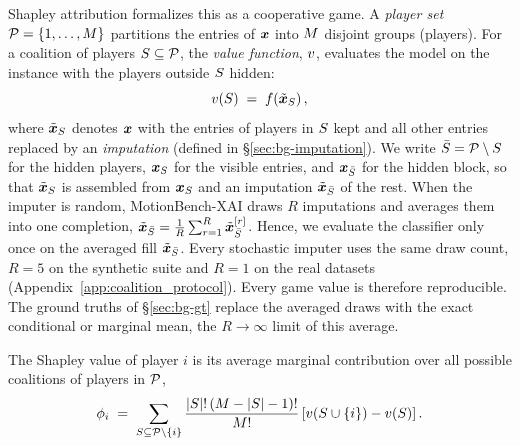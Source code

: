Shapley attribution \citep{lundberg2017unified} formalizes this as a cooperative game. A \emph{player set} $\mathcal{P} = \{1, \dots, M\}$ partitions the entries of $\bm{x}$ into $M$ disjoint groups (players).  For a coalition of players $S \subseteq \mathcal{P}$, the \emph{value function}, $v$, evaluates the model on the instance with the players outside $S$ hidden:
\begin{equation}
  v(S) \;=\; f\!\left(\tilde{\bm{x}}_{S}\right),
  \label{eq:value}
\end{equation}
where $\tilde{\bm{x}}_{S}$ denotes $\bm{x}$ with the entries of players in $S$ kept and all other entries replaced by an \emph{imputation} (defined in \S\ref{sec:bg-imputation}). We write $\bar{S} = \mathcal{P} \setminus S$ for the hidden players, $\bm{x}_{S}$ for the visible entries, and $\bm{x}_{\bar{S}}$ for the hidden block, so that $\tilde{\bm{x}}_{S}$ is assembled from $\bm{x}_{S}$ and an imputation $\tilde{\bm{x}}_{\bar{S}}$ of the rest.
When the imputer is random, MotionBench-XAI draws $R$ imputations and averages them into one completion, $\tilde{\bm{x}}_{\bar{S}} = \frac{1}{R} \sum_{r=1}^{R} \tilde{\bm{x}}^{[r]}_{\bar{S}}$. Hence, we evaluate the classifier only once on the averaged fill $\tilde{\bm{x}}_{\bar{S}}$. Every stochastic imputer uses the same draw count, $R{=}5$ on the synthetic suite and $R{=}1$ on the real datasets (Appendix~\ref{app:coalition_protocol}). Every game value is therefore reproducible. The ground truths of
\S\ref{sec:bg-gt} replace the averaged draws with the exact conditional or
marginal mean, the $R \to \infty$ limit of this average.


The Shapley value \citep{shapley1953value} of player $i$ is its average marginal contribution over all possible coalitions of players in $\mathcal{P}$,
\begin{equation}
  \phi_i \;=\; \sum_{S \subseteq \mathcal{P} \setminus \{i\}}
  \frac{|S|!\,(M - |S| - 1)!}{M!}
  \left[v(S \cup \{i\}) - v(S)\right].
  \label{eq:shapley}
\end{equation}

